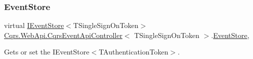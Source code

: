 \subsubsection{\texorpdfstring{Event\+Store}{EventStore}}
{\footnotesize\ttfamily virtual \hyperlink{interfaceCqrs_1_1Events_1_1IEventStore}{I\+Event\+Store}$<$T\+Single\+Sign\+On\+Token$>$ \hyperlink{classCqrs_1_1WebApi_1_1CqrsEventApiController}{Cqrs.\+Web\+Api.\+Cqrs\+Event\+Api\+Controller}$<$ T\+Single\+Sign\+On\+Token $>$.\hyperlink{classCqrs_1_1Events_1_1EventStore}{Event\+Store}\hspace{0.3cm}{\ttfamily [get]}, {\ttfamily [protected]}}



Gets or set the I\+Event\+Store$<$\+T\+Authentication\+Token$>$. 

